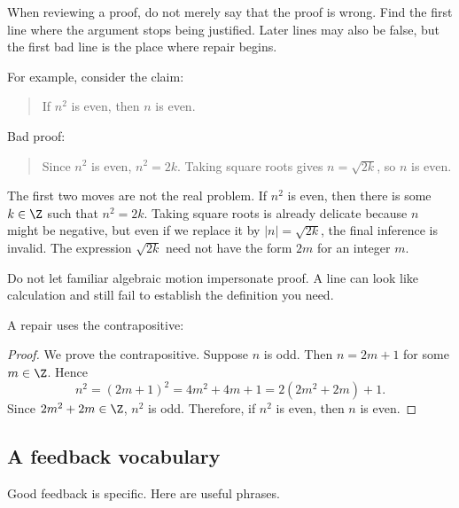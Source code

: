 When reviewing a proof, do not merely say that the proof is wrong. Find the first line where the argument stops being justified. Later lines may also be false, but the first bad line is the place where repair begins.

For example, consider the claim:

\begin{quote}
If $n^2$ is even, then $n$ is even.
\end{quote}

Bad proof:

\begin{quote}
Since $n^2$ is even, $n^2=2k$. Taking square roots gives $n=\sqrt{2k}$, so $n$ is even.
\end{quote}

The first two moves are not the real problem. If $n^2$ is even, then there is some $k\in\Z$ such that $n^2=2k$. Taking square roots is already delicate because $n$ might be negative, but even if we replace it by $|n|=\sqrt{2k}$, the final inference is invalid. The expression $\sqrt{2k}$ need not have the form $2m$ for an integer $m$.

\begin{trapbox}
Do not let familiar algebraic motion impersonate proof. A line can look like calculation and still fail to establish the definition you need.
\end{trapbox}

A repair uses the contrapositive:

\begin{proof}
We prove the contrapositive. Suppose $n$ is odd. Then $n=2m+1$ for some $m\in\Z$. Hence
\[
n^2=(2m+1)^2=4m^2+4m+1=2(2m^2+2m)+1.
\]
Since $2m^2+2m\in\Z$, $n^2$ is odd. Therefore, if $n^2$ is even, then $n$ is even.
\end{proof}

\subsection{A feedback vocabulary}

Good feedback is specific. Here are useful phrases.

